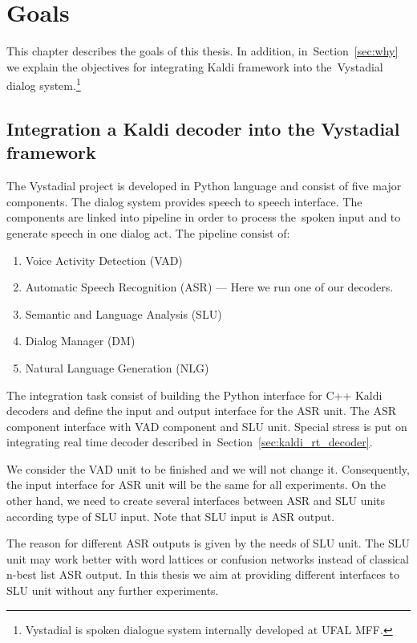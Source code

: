 \chapter{Goals}
\label{cha:goals}
This chapter describes the goals of this thesis. 
In addition, in~Section~\ref{sec:why} we explain the objectives for integrating Kaldi framework into the~Vystadial dialog system.\footnote{Vystadial is spoken dialogue system internally developed at UFAL MFF.} 


\section{Integration a Kaldi decoder into the Vystadial framework} 
\label{sec:integrate_kaldi_decoder_into_vystadial_framework}
The Vystadial project is developed in Python language and consist of five major components. 
The dialog system provides speech to speech interface. The components are linked into pipeline in order to process the~spoken input and to generate speech in one dialog act.
The pipeline consist of:
\begin{enumerate}
    \item Voice Activity Detection (VAD)
    \item Automatic Speech Recognition (ASR) --- Here we run one of our decoders.
    \item Semantic and Language Analysis (SLU)
    \item Dialog Manager (DM)
    \item Natural Language Generation (NLG)
\end{enumerate}

The integration task consist of building the Python interface for C++ Kaldi decoders and define the input and output interface for the ASR unit. The ASR component interface with VAD component and SLU unit. Special stress is put on integrating real time decoder described in~Section~\ref{sec:kaldi_rt_decoder}.

We consider the VAD unit to be finished and we will not change it. Consequently, the input interface for ASR unit will be the same for all experiments. On the other hand, we need to create several interfaces between ASR and SLU units according type of SLU input. Note that SLU input is ASR output. 

The reason for different ASR outputs is given by the needs of SLU unit. The SLU unit may work better with word lattices or confusion networks instead of classical n-best list ASR output. In this thesis we aim at providing different interfaces to SLU unit without any further experiments.

